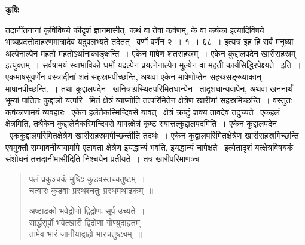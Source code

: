 \documentclass[11pt, openany]{book}
\begin{document}
\begin{center}
\textbf{\Large कृषिः \textendash\ }
\end{center}

तदानींतनानां कृषिविषये कीदृशं ज्ञानमासीत्, कथं वा तेषां कर्षणम्, के वा कर्षका इत्यादिविषये भाष्यप्रदत्तोदाहरणमात्रादेव यदुपलभ्यते तदेतत् \textendash\ वर्णो वर्णेन २~। १~। ६८~। इत्यत्र इह हि सर्वं मनुष्या अल्पेनाल्पेन महतो महतोऽर्थानाकाङ्क्षन्ति~। एकेन माषेण शतसहस्रम्~। एकेन कुद्दालपदेन खारीसहस्रम् इत्युक्तम्~। सर्वषामयं स्वाभाविको धर्मो यदल्पेन प्रयत्नेनाल्पेन मूल्येन वा महती कार्यसिद्धिरपेक्ष्यते \textendash\ इति~। एकमाषसुवर्णेन वस्त्रादीनां शतं सहस्रमपीच्छन्ति, अथवा एकेन माषेणोप्तेन सहस्रसङ्ख्याकान् माषानपीच्छन्ति.~। तथा कुद्दालपदेन \textendash\ खनित्राग्रस्थितपरिमितधान्येन \textendash\ तादृशधान्यवापेन, अथवा खननार्थं भूम्यां पातितः कुद्दालो यत्परि \textendash\ मितं क्षेत्रं व्याप्नोति तत्परिमितेन क्षेत्रेण खारीणां सहस्रमिच्छन्ति~। वस्तुतः कर्षकाणामयं व्यवहारः \textendash\ एकेन हलेतैकस्मिन्दिवसे यावत् \textendash\ क्षेत्रं क्रष्टुं शक्य तावदेव तदुच्यते \textendash\ एकहलं क्षेत्रमिति, तथैकेन कुद्दालेनैकस्मिन्दिवसे यावत्क्षेत्रं कृष्टं स्यात्तत्कुद्दालपदमिति~। एकेन कुद्दालपदेन \textendash\ एककुद्दालपरिमितक्षेत्रेण खारीसहस्रमपीच्छन्तीति तदर्थः~। एकेन कुद्वालपरिमितक्षेत्रेण {\qt खारीसहस्रमिच्छन्ति} एवमुक्तौ सम्भावनीयायामपि एतावता क्षेत्रेण इयद्धान्यं भवति, इयद्धान्यं चापेक्षते \textendash\ इत्येतादृशं यत्क्षेत्रविषयकं संशोधनं तत्तदानीमासीदिति निश्चयेन प्रतीयते~। तत्र खारीपरिमाणञ्च \textendash\ 

\begin{quote}
{\qt पलं प्रकुञ्चकं मुष्टिः कुडवस्तच्चतुष्टम्~।\\
चत्वारः कुडवाः प्रस्थश्चतुः प्रस्थमथाढकम्~॥

अष्टाढको भवेद्रोणो द्विद्रोणः सूर्प उच्यते~।\\
सार्द्धसूर्पो भवेत्खारी द्विद्रोणा गोण्युदाहृतम्~।\\
तामेव भारं जानीयाद्वाहो भारचतुष्ट्यम्~॥}
\end{quote}
\end{document}
